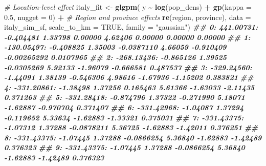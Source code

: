 \documentclass[
  letterpaper,
]{krantz}
\newenvironment{Shaded}{\begin{snugshade}}{\end{snugshade}}
\newcommand{\AttributeTok}[1]{\textcolor[rgb]{0.13,0.29,0.53}{#1}}
\newcommand{\CommentTok}[1]{\textcolor[rgb]{0.56,0.35,0.01}{\textit{#1}}}
\newcommand{\ConstantTok}[1]{\textcolor[rgb]{0.56,0.35,0.01}{#1}}
\newcommand{\DecValTok}[1]{\textcolor[rgb]{0.00,0.00,0.81}{#1}}
\newcommand{\DocumentationTok}[1]{\textcolor[rgb]{0.56,0.35,0.01}{\textbf{\textit{#1}}}}
\newcommand{\FloatTok}[1]{\textcolor[rgb]{0.00,0.00,0.81}{#1}}
\newcommand{\FunctionTok}[1]{\textcolor[rgb]{0.13,0.29,0.53}{\textbf{#1}}}
\newcommand{\NormalTok}[1]{#1}
\newcommand{\OtherTok}[1]{\textcolor[rgb]{0.56,0.35,0.01}{#1}}
\newcommand{\SpecialCharTok}[1]{\textcolor[rgb]{0.81,0.36,0.00}{\textbf{#1}}}
\newcommand{\StringTok}[1]{\textcolor[rgb]{0.31,0.60,0.02}{#1}}
\begin{document}
\begin{Shaded}
\begin{Highlighting}[]

                        \CommentTok{\# Location{-}level effect}
\NormalTok{italy\_fit }\OtherTok{\textless{}{-}} \FunctionTok{glgpm}\NormalTok{( y }\SpecialCharTok{\textasciitilde{}} \FunctionTok{log}\NormalTok{(pop\_dens) }\SpecialCharTok{+} \FunctionTok{gp}\NormalTok{(}\AttributeTok{kappa =} \FloatTok{0.5}\NormalTok{, }\AttributeTok{nugget =} \DecValTok{0}\NormalTok{) }\SpecialCharTok{+}
                        \CommentTok{\# Region and province effects}
                        \FunctionTok{re}\NormalTok{(region, province),}
         \AttributeTok{data =}\NormalTok{ italy\_sim\_sf, }\AttributeTok{scale\_to\_km =} \ConstantTok{TRUE}\NormalTok{,}
         \AttributeTok{family =} \StringTok{"gaussian"}\NormalTok{)}
\DocumentationTok{\#\#   0:     441.00731: {-}0.404481  1.33798  0.00000  4.62406  0.00000  0.00000  0.00000}
\DocumentationTok{\#\#   1:    {-}130.05497: {-}0.408825  1.35003 {-}0.0387110  4.66059 {-}0.910409 {-}0.00265292 0.0107965}
\DocumentationTok{\#\#   2:    {-}268.13436: {-}0.865126  1.39525 {-}0.0305269  5.92133 {-}1.96079 {-}0.666581 0.487537}
\DocumentationTok{\#\#   3:    {-}329.24560: {-}1.44091  1.38139 {-}0.546306  4.98616 {-}1.67936 {-}1.15202 0.383821}
\DocumentationTok{\#\#   4:    {-}331.20861: {-}1.38498  1.37256 0.165463  5.61366 {-}1.63033 {-}2.11435 0.371263}
\DocumentationTok{\#\#   5:    {-}331.28418: {-}0.874796  1.37322 {-}0.271990  5.18071 {-}1.62887 {-}0.970704 0.371407}
\DocumentationTok{\#\#   6:    {-}331.42968: {-}1.04087  1.37294 {-}0.119652  5.33634 {-}1.62883 {-}1.33321 0.375031}
\DocumentationTok{\#\#   7:    {-}331.43375: {-}1.07312  1.37288 {-}0.0878211  5.36725 {-}1.62883 {-}1.42011 0.376251}
\DocumentationTok{\#\#   8:    {-}331.43375: {-}1.07445  1.37288 {-}0.0866254  5.36840 {-}1.62883 {-}1.42489 0.376323}
\DocumentationTok{\#\#   9:    {-}331.43375: {-}1.07445  1.37288 {-}0.0866254  5.36840 {-}1.62883 {-}1.42489 0.376323}


\end{Highlighting}
\end{Shaded}
\end{document}
